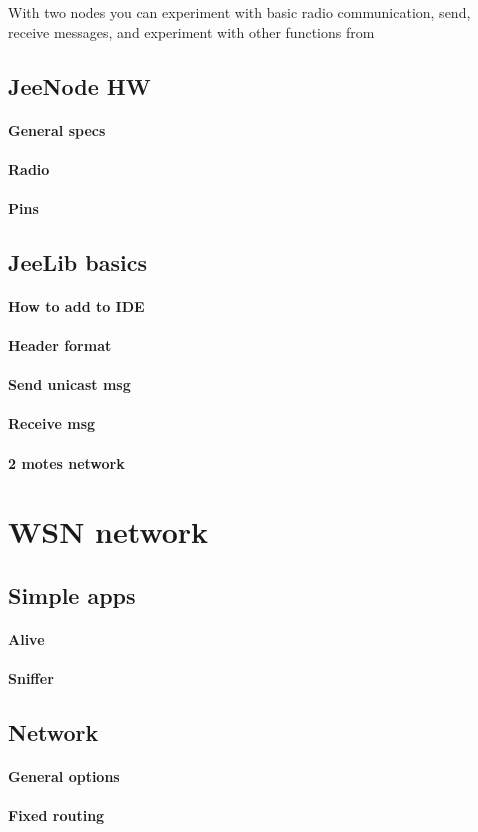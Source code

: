 \documentclass[12pt,titlepage]{article}
\begin{document}
With two nodes you can experiment with basic radio communication, send, receive messages, and experiment with other functions from
     \subsection{JeeNode HW }
        \paragraph{General specs}
        \paragraph{Radio}
        \paragraph{Pins}

    \subsection{JeeLib basics}
        \paragraph{How to add to IDE}
        \paragraph{Header format}
        \paragraph{Send unicast msg}
        \paragraph{Receive msg}
        \paragraph{2 motes network}

\section{WSN network}
    \subsection{Simple apps}
        \paragraph{Alive}
        \paragraph{Sniffer}

    \subsection{Network}
        \paragraph{General options}
        \paragraph{Fixed routing}
\end{document}
